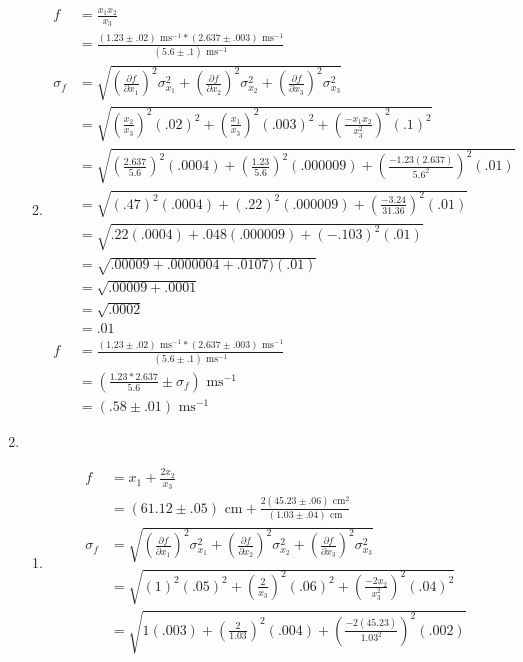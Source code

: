 \documentclass{article}
\begin{document}
\begin{enumerate}
\begin{enumerate}
\begin{align*}
\end{align*}
\item
\begin{align*}
f &= \frac{x_1x_2}{x_3}\\
&= \frac{(1.23 \pm .02)\text{ ms}^{-1} * (2.637 \pm .003)\text{ ms}^{-1}}{(5.6 \pm .1)\text{ ms}^{-1}}\\
\sigma_{f} &= \sqrt{(\frac{\partial f}{\partial x_1})^2\sigma_{x_1}^2 + (\frac{\partial f}{\partial x_2})^2\sigma_{x_2}^2 + (\frac{\partial f}{\partial x_3})^2\sigma_{x_3}^2}\\
&= \sqrt{(\frac{x_2}{x_3})^2(.02)^2 + (\frac{x_1}{x_3})^2(.003)^2 + (\frac{-x_1x_2}{x_3^2})^2(.1)^2}\\
&= \sqrt{(\frac{2.637}{5.6})^2(.0004) + (\frac{1.23}{5.6})^2(.000009) + (\frac{-1.23(2.637)}{5.6^2})^2(.01)}\\
&= \sqrt{(.47)^2(.0004) + (.22)^2(.000009) + (\frac{-3.24}{31.36})^2(.01)}\\
&= \sqrt{.22(.0004) + .048(.000009) + (-.103)^2(.01)}\\
&= \sqrt{.00009 + .0000004 + .0107)(.01)}\\
&= \sqrt{.00009 + .0001}\\
&= \sqrt{.0002}\\
&= .01\\
f &= \frac{(1.23 \pm .02)\text{ ms}^{-1} * (2.637 \pm .003)\text{ ms}^{-1}}{(5.6 \pm .1)\text{ ms}^{-1}}\\
&= (\frac{1.23 * 2.637}{5.6} \pm \sigma_{f})\text{ ms}^{-1}\\
&= (.58 \pm .01)\text{ ms}^{-1}
\end{align*}
\end{enumerate}
\item
\begin{enumerate}
\item
\begin{align*}
f &= x_1 + \frac{2x_2}{x_3}\\
&= (61.12 \pm .05)\text{ cm} + \frac{2(45.23 \pm .06)\text{ cm}^2}{(1.03 \pm .04)\text{ cm}}\\
\sigma_{f} &= \sqrt{(\frac{\partial f}{\partial x_1})^2\sigma_{x_1}^2 + (\frac{\partial f}{\partial x_2})^2\sigma_{x_2}^2 + (\frac{\partial f}{\partial x_3})^2\sigma_{x_3}^2}\\
&= \sqrt{(1)^2(.05)^2 + (\frac2{x_3})^2(.06)^2 + (\frac{-2x_2}{x_3^2})^2(.04)^2}\\
&= \sqrt{1(.003) + (\frac2{1.03})^2(.004) + (\frac{-2(45.23)}{1.03^2})^2(.002)}\\

\end{align*}
\end{enumerate}
\end{enumerate}
\end{document}
